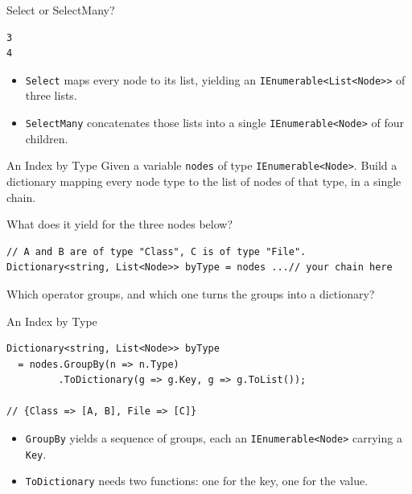 \begin{solutionframe}{Select or SelectMany?}
  \begin{lstlisting}[language={},basicstyle=\scriptsize\ttfamily]
3
4
  \end{lstlisting}
  \begin{itemize}
    \item \texttt{Select} maps every node to its list, yielding an
      \texttt{IEnumerable<List<Node>>} of three lists.
    \item \texttt{SelectMany} concatenates those lists into a single
      \texttt{IEnumerable<Node>} of four children.
  \end{itemize}
  \vspace{4ex}

\end{solutionframe}

\begin{exerciseframe}{An Index by Type}
  Given a variable \texttt{nodes} of type \texttt{IEnumerable<Node>}.
  Build a dictionary mapping every node type to the list of nodes of that type,
  in a single chain.

  What does it yield for the three nodes below?
  \vspace{1ex}

  \begin{lstlisting}[basicstyle=\scriptsize\ttfamily]
// A and B are of type "Class", C is of type "File".
Dictionary<string, List<Node>> byType = nodes ...// your chain here
  \end{lstlisting}
  \vspace{1ex}

  Which operator groups, and which one turns the groups into a dictionary?
\end{exerciseframe}

\begin{solutionframe}{An Index by Type}
  \begin{lstlisting}[basicstyle=\scriptsize\ttfamily]
Dictionary<string, List<Node>> byType
  = nodes.GroupBy(n => n.Type)
         .ToDictionary(g => g.Key, g => g.ToList());

// {Class => [A, B], File => [C]}
  \end{lstlisting}
  \begin{itemize}
    \item \texttt{GroupBy} yields a sequence of groups, each an
      \texttt{IEnumerable<Node>} carrying a \texttt{Key}.
    \item \texttt{ToDictionary} needs two functions: one for the key, one for
      the value.
  \end{itemize}
  \vspace{4ex}

\end{solutionframe}

